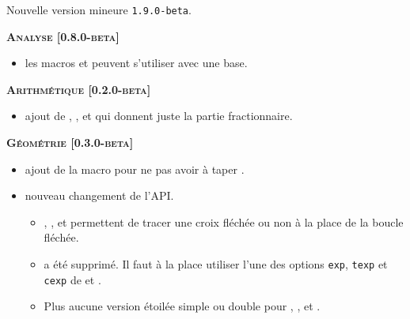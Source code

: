 Nouvelle version mineure \verb+1.9.0-beta+.




\begin{center}
    \textbf{\textsc{Analyse [0.8.0-beta]}}
\end{center}

\begin{itemize}[itemsep=.5em]
    \item {}
          les macros  et  peuvent s'utiliser avec une base.
    
\end{itemize}


\separation




\begin{center}
    \textbf{\textsc{Arithmétique [0.2.0-beta]}}
\end{center}

\begin{itemize}[itemsep=.5em]
    \item {}
    	  ajout de , ,  et  qui donnent juste la partie fractionnaire.
\end{itemize}


\separation




\begin{center}
    \textbf{\textsc{Géométrie [0.3.0-beta]}}
\end{center}

\begin{itemize}[itemsep=.5em]
    \item {}
          ajout de la macro  pour ne pas avoir à taper .


    \item {} nouveau changement de l'API.
    \begin{itemize}[itemsep=.5em]
        \item {}, ,  et  permettent de tracer une croix fléchée ou non à la place de la boucle fléchée.

        \item {} a été supprimé. Il faut à la place utiliser l'une des options \verb#exp#, \verb#texp# et \verb#cexp# de  et .

        \item Plus aucune version étoilée simple ou double pour , ,  et .
    \end{itemize}


\end{itemize}


